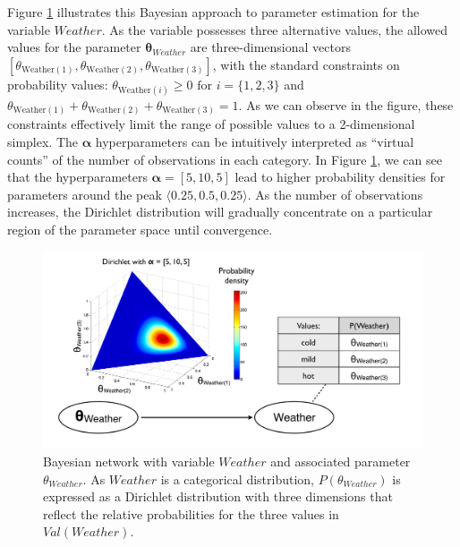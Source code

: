 Figure \ref{fig:baysianlearning} illustrates this Bayesian approach to parameter estimation for the variable $\mathit{Weather}$.  As the variable possesses three alternative values, the allowed values for the parameter $\boldsymbol\theta_{\mathit{Weather}}$ are three-dimensional vectors $[ \theta_{\mathrm{Weather}(1)}, \theta_{\mathrm{Weather}(2)}, \theta_{\mathrm{Weather}(3)} ]$, with the standard constraints on probability values: $\theta_{\mathrm{Weather}(i)} \geq 0 \text{ for } i=\{1,2,3\} $ and $\theta_{\mathrm{Weather}(1)} + \theta_{\mathrm{Weather}(2)} + \theta_{\mathrm{Weather}(3)} = 1$.   As we can observe in the figure, these constraints effectively limit the range of possible values to a 2-dimensional simplex. The $\boldsymbol\alpha$ hyperparameters can be intuitively interpreted as ``virtual counts'' of the number of observations in each category.   In Figure \ref{fig:baysianlearning}, we can see that the hyperparameters $\boldsymbol\alpha = [5,10,5]$ lead to higher probability densities for parameters around the peak $\langle 0.25, 0.5, 0.25 \rangle$.  As the number of observations increases, the Dirichlet distribution will gradually concentrate on a particular region of the parameter space until convergence.


\begin{figure}[ht]
\centering
\includegraphics[scale=0.3]{imgs/bayesianlearning.pdf}
\caption{Bayesian network with variable $\mathit{Weather}$ and associated parameter $\theta_{Weather}$.  As $\mathit{Weather}$ is a categorical distribution, $P(\theta_{Weather})$ is expressed as a Dirichlet distribution with three dimensions that reflect the relative probabilities for the three values in $\mathit{Val}(\mathit{Weather})$. }
\label{fig:baysianlearning}
\end{figure}

